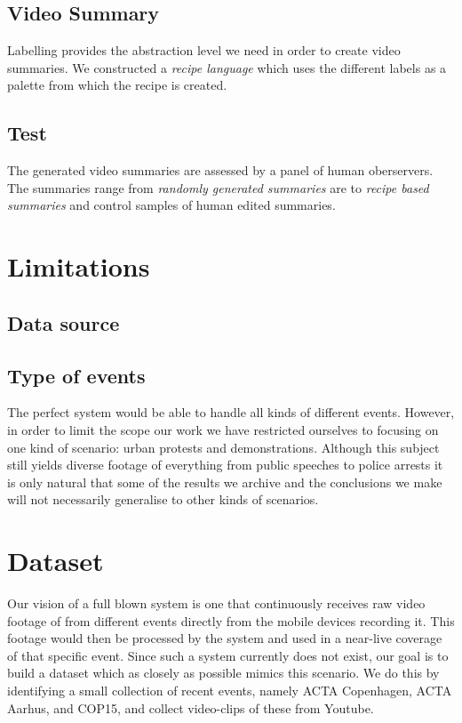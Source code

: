 \subsection{Video Summary}
%
Labelling provides the abstraction level we need in order to create video summaries. We constructed a \textit{recipe language} which uses the different labels as a palette from which the recipe is created. 
%
\subsection{Test}
%
The generated video summaries are assessed by a panel of human oberservers. The summaries range from \textit{randomly generated summaries} are to \textit{recipe based summaries} and control samples of human edited summaries. 
%
\section{Limitations}
%
%
\subsection{Data source}
%
%
\subsection{Type of events}
%
The perfect system would be able to handle all kinds of different events. However, in order to limit the scope our work we have restricted ourselves to focusing on one kind of scenario: urban protests and demonstrations. Although this subject still yields diverse footage of everything from public speeches to police arrests it is only natural that some of the results we archive and the conclusions we make will not necessarily generalise to other kinds of scenarios.
%
\section{Dataset}\label{sec:dataset}
%
Our vision of a full blown system is one that continuously receives raw video footage of from different events directly from the mobile devices recording it. This footage would then be processed by the system and used in a near-live coverage of that specific event. Since such a system currently does not exist, our goal is to build a dataset which as closely as possible mimics this scenario. We do this by identifying a small collection of recent events, namely ACTA Copenhagen, ACTA Aarhus, and COP15, and collect video-clips of these from Youtube.
%
